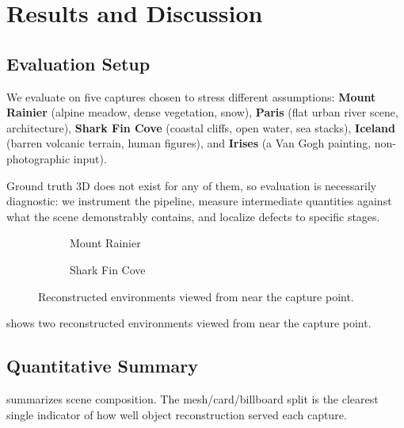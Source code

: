 \section{Results and Discussion}
\label{sec:results}

\subsection{Evaluation Setup}

We evaluate on five captures chosen to stress different assumptions:
\textbf{Mount Rainier} (alpine meadow, dense vegetation, snow),
\textbf{Paris} (flat urban river scene, architecture),
\textbf{Shark Fin Cove} (coastal cliffs, open water, sea stacks),
\textbf{Iceland} (barren volcanic terrain, human figures), and
\textbf{Irises} (a Van Gogh painting, non-photographic input).

Ground truth 3D does not exist for any of them, so evaluation is necessarily
diagnostic: we instrument the pipeline, measure intermediate quantities against
what the scene demonstrably contains, and localize defects to specific stages.

\begin{figure}[t]
  \centering
  \begin{subfigure}{0.48\textwidth}
    \centering
    \caption{Mount Rainier}
  \end{subfigure}\hfill
  \begin{subfigure}{0.48\textwidth}
    \centering
    \caption{Shark Fin Cove}
  \end{subfigure}
  \caption{Reconstructed environments viewed from near the capture point.}
  \label{fig:scenes}
\end{figure}

 shows two reconstructed environments viewed from near the
capture point.

\subsection{Quantitative Summary}

 summarizes scene composition. The mesh/card/billboard split is
the clearest single indicator of how well object reconstruction served each
capture.

